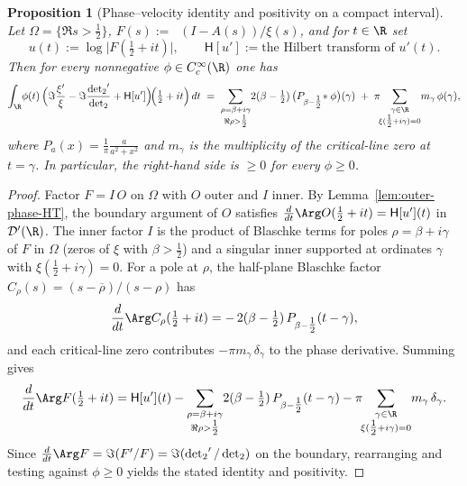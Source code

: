 \documentclass[11pt]{article}
\newtheorem{proposition}[theorem]{Proposition}
\theoremstyle{remark}
\DeclareMathOperator{\dettwo}{det_2}
\begin{document}
\begin{proposition}[Phase–velocity identity and positivity on a compact interval]\label{prop:phase-velocity-identity}
Let \(\Omega=\{\Re s>\tfrac12\}\), \(F(s):=\dettwo(I-A(s))/\xi(s)\), and for \(t\in\R\) set
\[
 u(t):=\log\big|F(\tfrac12+it)\big|,\qquad
 \mathsf H[u']:=\text{the Hilbert transform of }u'(t).
\]
Then for every nonnegative \(\phi\in C_c^\infty(\R)\) one has
\[
\int_{\R}\!\phi(t)\,\Big(\Im\frac{\xi'}{\xi}-\Im\frac{\dettwo'}{\dettwo}+\mathsf H[u']\Big)\!\Big(\tfrac12+it\Big)\,dt
\;=\;\sum_{\substack{\rho=\beta+i\gamma\\ \Re\rho>\tfrac12}}\! 2(\beta-\tfrac12)\,\big(P_{\beta-\tfrac12}\!\ast\phi\big)(\gamma)
\; +\; \pi\!\!\sum_{\substack{\gamma\in\R\\ \xi(\tfrac12+i\gamma)=0}}\! m_\gamma\,\phi(\gamma),
\]
where \(P_a(x)=\frac{1}{\pi}\frac{a}{a^2+x^2}\) and \(m_\gamma\) is the multiplicity of the critical-line zero at \(t=\gamma\). In particular, the right-hand side is \(\ge 0\) for every \(\phi\ge 0\).
\end{proposition}
\begin{proof}
Factor \(F=I\,O\) on \(\Omega\) with \(O\) outer and \(I\) inner. By Lemma~\ref{lem:outer-phase-HT}, the boundary argument of \(O\) satisfies \(\frac{d}{dt}\Arg O(\tfrac12+it)=\mathsf H[u'](t)\) in \(\mathcal D'(\R)\). The inner factor \(I\) is the product of Blaschke terms for poles \(\rho=\beta+i\gamma\) of \(F\) in \(\Omega\) (zeros of \(\xi\) with \(\beta>\tfrac12\)) and a singular inner supported at ordinates \(\gamma\) with \(\xi(\tfrac12+i\gamma)=0\). For a pole at \(\rho\), the half-plane Blaschke factor \(C_\rho(s)=(s-\overline\rho)/(s-\rho)\) has
\[
\frac{d}{dt}\Arg C_\rho(\tfrac12+it)=-\,2(\beta-\tfrac12)\,P_{\beta-\tfrac12}(t-\gamma),
\]
and each critical-line zero contributes \(-\pi m_\gamma\,\delta_\gamma\) to the phase derivative. Summing gives
\[
\frac{d}{dt}\Arg F(\tfrac12+it)=\mathsf H[u'](t)
-\sum_{\substack{\rho=\beta+i\gamma\\ \Re\rho>\tfrac12}}\! 2(\beta-\tfrac12)\,P_{\beta-\tfrac12}(t-\gamma)
-\pi\!\!\sum_{\substack{\gamma\in\R\\ \xi(\tfrac12+i\gamma)=0}}\! m_\gamma\,\delta_\gamma.
\]
Since \(\frac{d}{dt}\Arg F=\Im(F'/F)=\Im(\dettwo'/\dettwo)\) on the boundary, rearranging and testing against \(\phi\ge 0\) yields the stated identity and positivity.
\end{proof}
\end{document}
